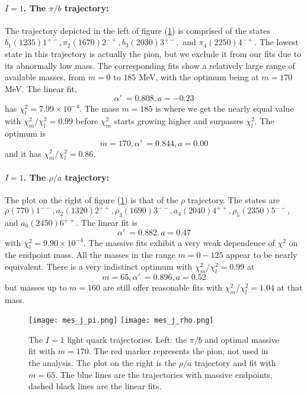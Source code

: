 \documentclass[11pt,a4]{article}
\newcommand{\alp}{\ensuremath{\alpha'\:}}
\newcommand{\rchi}[1]{\ensuremath{\chi^2_m/\chi^2_l = #1}}
\newcommand{\ten}[1]{\times10^{#1}}
\begin{document}
				\paragraph{\(I = 1\). The \(\pi/b\) trajectory:} The trajectory depicted in the left of figure (\ref{fig:pi_rho}) is comprised of the states \(b_1(1235) 1^{+-}, \pi_2(1670) 2^{-+}, b_3(2030) 3^{+-},\) and \(\pi_4(2250) 4^{-+}\). The lowest state in this trajectory is actually the pion, but we exclude it from our fits due to its abnormally low mass. The corresponding fits show a relatively large range of available masses, from \(m = 0\) to \(185\) MeV, with the optimum being at \(m = 170\) MeV. The linear fit,
				\[ \alp = 0.808, a = -0.23 \]
				has \(\chi^2_l = 7.99\ten{-4}\). The mass \(m = 185\) is where we get the nearly equal value with \rchi{0.99} before \(\chi^2_m\) starts growing higher and surpasses \(\chi^2_l\). The optimum is
				\[ m = 170, \alp = 0.844, a = 0.00 \]
				and it has \rchi{0.86}.
				
				\paragraph{\(I = 1\). The \(\rho/a\) trajectory:} The plot on the right of figure (\ref{fig:pi_rho}) is that of the \(\rho\) trajectory. The states are \(\rho(770)1^{--}, a_2(1320)2^{++}, \rho_3(1690)3^{--}, a_4(2040)4^{++}, \rho_5(2350)5^{--},\) and \(a_6(2450)6^{++}\). The linear fit is
				\[ \alp = 0.882, a = 0.47 \]
				with \(\chi^2_l = 9.90\ten{-4}\).	The massive fits exhibit a very weak dependence of \(\chi^2\) on the endpoint mass. All the masses in the range \(m = 0-125\) appear to be nearly equivalent. There is a very indistinct optimum with \rchi{0.99} at
				\[ m = 65, \alp = 0.896, a = 0.52 \]				
				but masses up to \(m = 160\) are still offer reasonable fits with \rchi{1.04} at that mass.				
				
				\begin{figure}[tbp] \centering
						\texttt{[image: mes\_j\_pi.png]}	 \hfill
						\texttt{[image: mes\_j\_rho.png]}
						\caption{\label{fig:pi_rho} The \(I = 1\) light quark trajectories. Left: the \(\pi/b\) and optimal massive fit with \(m = 170\). The red marker represents the pion, not used in the analysis. The plot on the right is the \(\rho/a\) trajectory and fit with \(m = 65\). The blue lines are the trajectories with massive endpoints, dashed black lines are the linear fits.}
				\end{figure}
					
\end{document}
